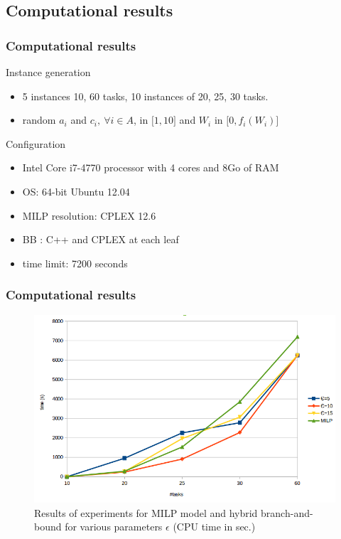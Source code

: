 \subsection{Computational results}
\begin{frame}
  \frametitle{Computational results}
  \begin{block}{Instance generation}
    \begin{itemize}
    \item 5 instances 10, 60 tasks, 10 instances of 20, 25, 30 tasks. 
    \item random  $a_i$ and $c_i,\ \forall i \in A$, in ${[}1,10{]}$ and $W_i$ in ${[}0,f_i(W_i){]}$
    \end{itemize}
  \end{block}
  \begin{block}{Configuration}
    \begin{itemize}
    \item Intel Core i7-4770 processor with 4 cores and 8Go of RAM
    \item OS: 64-bit Ubuntu 12.04
    \item MILP resolution: CPLEX 12.6  
    \item BB : C++ and CPLEX at each leaf
    \item time limit: 7200 seconds
    \end{itemize}
  \end{block}
  

\end{frame}


\begin{frame}
  \frametitle{Computational results}
  \begin{figure}[!htb]
    \centering
    \includegraphics[width=0.9\linewidth]{figures/BB_time.png}
    \caption{Results of experiments for MILP model and hybrid branch-and-bound 
      for various parameters $\epsilon$ (CPU time in sec.)}
  \end{figure}

\end{frame}


